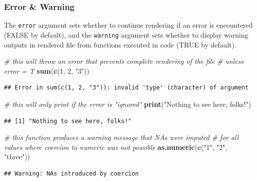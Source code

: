 \documentclass[
]{article}
\newenvironment{Shaded}{\begin{snugshade}}{\end{snugshade}}
\newcommand{\CommentTok}[1]{\textcolor[rgb]{0.56,0.35,0.01}{\textit{#1}}}
\newcommand{\DecValTok}[1]{\textcolor[rgb]{0.00,0.00,0.81}{#1}}
\newcommand{\FunctionTok}[1]{\textcolor[rgb]{0.13,0.29,0.53}{\textbf{#1}}}
\newcommand{\NormalTok}[1]{#1}
\newcommand{\StringTok}[1]{\textcolor[rgb]{0.31,0.60,0.02}{#1}}
\begin{document}
\subsubsection{Error \& Warning}\label{error-warning}

The \texttt{error} argument sets whether to continue rendering if an
error is encountered (FALSE by default), and the \texttt{warning}
argument sets whether to display warning outputs in rendered file from
functions executed in code (TRUE by default).

\begin{Shaded}
\begin{Highlighting}[]
\CommentTok{\# this will throw an error that prevents complete rendering of the file}
\CommentTok{\# unless error = T}
\FunctionTok{sum}\NormalTok{(}\FunctionTok{c}\NormalTok{(}\DecValTok{1}\NormalTok{, }\DecValTok{2}\NormalTok{, }\StringTok{"3"}\NormalTok{))}
\end{Highlighting}
\end{Shaded}

\begin{verbatim}
## Error in sum(c(1, 2, "3")): invalid 'type' (character) of argument
\end{verbatim}

\begin{Shaded}
\begin{Highlighting}[]
\CommentTok{\# this will only print if the error is "ignored"}
\FunctionTok{print}\NormalTok{(}\StringTok{"Nothing to see here, folks!"}\NormalTok{)}
\end{Highlighting}
\end{Shaded}

\begin{verbatim}
## [1] "Nothing to see here, folks!"
\end{verbatim}

\begin{Shaded}
\begin{Highlighting}[]
\CommentTok{\# this function produces a warning message that NAs were imputed}
\CommentTok{\# for all values where coercion to numeric was not possible}
\FunctionTok{as.numeric}\NormalTok{(}\FunctionTok{c}\NormalTok{(}\StringTok{"1"}\NormalTok{, }\StringTok{"2"}\NormalTok{, }\StringTok{"three"}\NormalTok{))}
\end{Highlighting}
\end{Shaded}

\begin{verbatim}
## Warning: NAs introduced by coercion
\end{verbatim}
\end{document}
